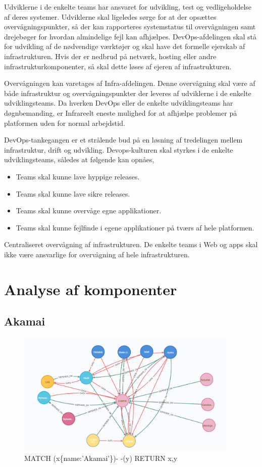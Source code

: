\documentclass{article}
\begin{document}
Udviklerne i de enkelte teams har ansvaret for udvikling, test og vedligeholdelse af deres systemer. Udviklerne skal ligeledes sørge for at der opsættes overvågningspunkter, så der kan rapporteres systemstatus til overvågningen samt drejebøger for hvordan almindelige fejl kan afhjælpes.
DevOps-afdelingen skal stå for udvikling af de nødvendige værktøjer og skal have det formelle ejerskab af infrastrukturen. Hvis der er nedbrud på netværk, hosting eller andre infrastrukturkomponenter, så skal dette løses af ejeren af infrastrukturen.

Overvågningen kan varetages af Infra-afdelingen. Denne overvågning skal være af både infrastruktur og overvågningspunkter der leveres af udviklerne i de enkelte udviklingsteams. Da hverken DevOps eller de enkelte udviklingsteams har døgnbemanding, er Infrareelt eneste mulighed for at afhjælpe problemer på platformen uden for normal arbejdstid.

DevOps-tankegangen er et strålende bud på en løsning af tredelingen mellem infrastruktur, drift og udvikling.
Devops-kulturen skal styrkes i de enkelte udviklingsteams, således at følgende kan opnåes,

\begin{itemize}
    \item Teams skal kunne lave hyppige releases.
    \item Teams skal kunne lave sikre releases.
    \item Teams skal kunne overvåge egne applikationer.
    \item Teams skal kunne fejlfinde i egene applikationer på tværs af hele platformen.
\end{itemize}

Centraliseret overvågning af infrastrukturen.
De enkelte teams i Web og apps skal ikke være ansvarlige for overvågning af hele infrastrukturen.


\section{Analyse af komponenter}

\subsection{Akamai}
\begin{figure}[h]
\includegraphics[width=300pt]{Akamai.PNG}
\caption{MATCH (x\{name:'Akamai'\})- -(y) RETURN x,y}
\end{figure}
\end{document}
